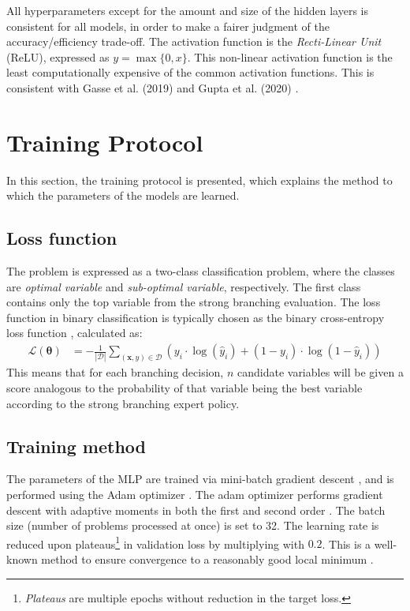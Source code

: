 All hyperparameters except for the amount and size of the hidden layers is consistent for all models, in order to make a fairer judgment of the accuracy/efficiency trade-off. The activation function is the \textit{Recti-Linear Unit} (ReLU), expressed as $y = \max \{ 0, x\}$. This non-linear activation function is the least computationally expensive of the common activation functions. This is consistent with Gasse et al. (2019) \cite{gasse2019exact} and Gupta et al. (2020) \cite{gupta2020hybrid}.


\section{Training Protocol}\label{sec:trainingprotocol}

In this section, the training protocol is presented, which explains the method to which the parameters of the models are learned.


\subsection{Loss function}

The problem is expressed as a two-class classification problem, where the classes are \textit{optimal variable} and \textit{sub-optimal variable}, respectively. The first class contains only the top variable from the strong branching evaluation. The loss function in binary classification is typically chosen as the binary cross-entropy loss function \cite{goodfellow2016deep}, calculated as:
\begin{align}
    \bm{\mathcal{L}}(\bm{\theta}) &= - \frac{1}{|\mathcal{D}|}\sum_{(\bm{x}, y) \in \mathcal{D}} \left( y_i \cdot \log( \hat y_i) + (1-y_i) \cdot \log(1 - \hat y_i) \right)
\end{align}
This means that for each branching decision, $n$ candidate variables will be given a score analogous to the probability of that variable being the best variable according to the strong branching expert policy. 

\subsection{Training method}

The parameters of the \gls{MLP} are trained via mini-batch gradient descent \cite{goodfellow2016deep}, and is performed using 
 the Adam optimizer \cite{kingma2017adam}. The adam optimizer performs gradient descent with adaptive moments in both the first and second order \cite{kingma2017adam}. 
 The batch size (number of problems processed at once) is set to 32. The learning rate is reduced upon plateaus\footnote{\textit{Plateaus} are multiple epochs without reduction in the target loss.} in validation loss 
 by multiplying with $ 0.2 $. This is a well-known method to ensure convergence to a reasonably good local minimum \cite{goodfellow2016deep}.
 
